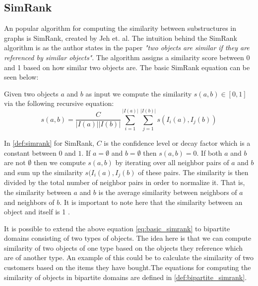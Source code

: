 \subsection{SimRank}
An popular algorithm for computing the similarity between substructures in graphs is SimRank, created by Jeh et. al\cite{10.1145/775047.775126}. The intuition behind the SimRank algorithm is as the author states in the paper \emph{"two objects are similar if they are referenced by similar objects"}\cite{10.1145/775047.775126}. The algorithm assigns a similarity score between 0 and 1 based on how similar two objects are. The basic SimRank equation can be seen below:
\begin{definition}[SimRank]\label{def:simrank} Given two objects $a$ and $b$ as input we compute the similarity $s(a,b) \in [0,1]$ via the following recursive equation:
	\begin{equation}\label{eq:basic_simrank}
	s(a,b)= \frac{C}{|I(a)||I(b)|}\sum^{|I(a)|}_{i=1}\sum^{|I(b)|}_{j=1}s(I_i(a),I_j(b))
	\end{equation}
\end{definition}
In \autoref{def:simrank} for SimRank, $C$ is the confidence level or decay factor which is a constant between $0$ and $1$. If $a=\emptyset$ and $b= \emptyset$ then $s(a,b) = 0$. If both $a$ and $b$ are not $\emptyset$ then we compute $s(a,b)$ by iterating over all neighbor  pairs of $a$ and $b$ and sum up the similarity $s(I_i(a),I_j(b)$ of these pairs. The similarity is then divided by the total number of neighbor pairs in order to normalize it. That is, the similarity between $a$ and $b$ is the average similarity between neighbors of $a$ and neighbors of $b$. It is important to note here that the similarity between an object and itself is 1 \cite{10.1145/775047.775126}.

It is possible to extend the above equation \ref{eq:basic_simrank} to bipartite domains consisting of two types of objects. The idea here is that we can compute similarity of two objects of one type based on the objects they reference which are of another type. An example of this could be to calculate the similarity of two customers based on the items they have bought\cite{10.1145/775047.775126}.The equations for computing the similarity of objects in bipartite domains are defined in \autoref{def:bipartite_simrank}.


